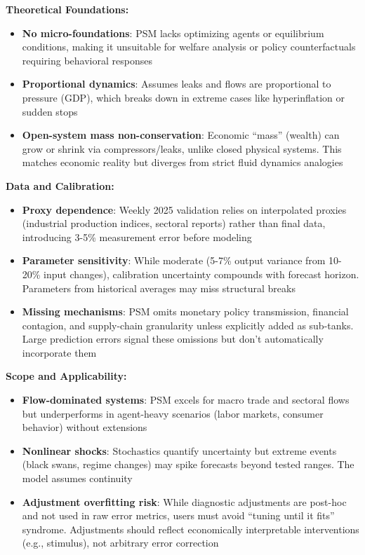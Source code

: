 \documentclass[11pt]{article}
\begin{document}
\textbf{Theoretical Foundations:}
\begin{itemize}
\item \textbf{No micro-foundations}: PSM lacks optimizing agents or equilibrium conditions, making it unsuitable for welfare analysis or policy counterfactuals requiring behavioral responses
\item \textbf{Proportional dynamics}: Assumes leaks and flows are proportional to pressure (GDP), which breaks down in extreme cases like hyperinflation or sudden stops
\item \textbf{Open-system mass non-conservation}: Economic ``mass'' (wealth) can grow or shrink via compressors/leaks, unlike closed physical systems. This matches economic reality but diverges from strict fluid dynamics analogies
\end{itemize}

\textbf{Data and Calibration:}
\begin{itemize}
\item \textbf{Proxy dependence}: Weekly 2025 validation relies on interpolated proxies (industrial production indices, sectoral reports) rather than final data, introducing 3-5\% measurement error before modeling
\item \textbf{Parameter sensitivity}: While moderate (5-7\% output variance from 10-20\% input changes), calibration uncertainty compounds with forecast horizon. Parameters from historical averages may miss structural breaks
\item \textbf{Missing mechanisms}: PSM omits monetary policy transmission, financial contagion, and supply-chain granularity unless explicitly added as sub-tanks. Large prediction errors signal these omissions but don't automatically incorporate them
\end{itemize}

\textbf{Scope and Applicability:}
\begin{itemize}
\item \textbf{Flow-dominated systems}: PSM excels for macro trade and sectoral flows but underperforms in agent-heavy scenarios (labor markets, consumer behavior) without extensions
\item \textbf{Nonlinear shocks}: Stochastics quantify uncertainty but extreme events (black swans, regime changes) may spike forecasts beyond tested ranges. The model assumes continuity
\item \textbf{Adjustment overfitting risk}: While diagnostic adjustments are post-hoc and not used in raw error metrics, users must avoid ``tuning until it fits'' syndrome. Adjustments should reflect economically interpretable interventions (e.g., stimulus), not arbitrary error correction
\end{itemize}
\end{document}
